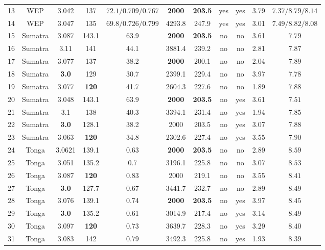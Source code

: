 \documentclass[12pt]{article}
\begin{document}
{\begin{table}
\begin{table}[H]
{\begin{tabular}{c c c c c c c c c c c }
         13 &WEP& 3.042 & 137 & $72.1/0.709/0.767$ & \textbf{2000} & \textbf{203.5} & yes  &yes & 3.79 &$7.37/8.79/8.14$ \\
         14 &WEP& 3.047 & 135 & $69.8/0.726/0.799$ & 4293.8 & 247.9 & yes  &yes &3.01 &$7.49/8.82/8.08$ \\
         15 &Sumatra& 3.087 & 143.1 & $63.9$ &  \textbf{2000}& \textbf{203.5}& no &no &3.61 & $7.79$    \\
         16 &Sumatra& 3.11 & 141 & 44.1 & 3881.4 & 239.2   &no &no &2.81 & $7.87$ \\
         17 &Sumatra& 3.077 & 137 & 38.2 & \textbf{2000} & 200.1   &no &no &2.04 &$7.89$\\ 
         18 &Sumatra& \textbf{3.0} & 129 & 30.7 & 2399.1 & 229.4   &no &no &3.97 &$7.78$ \\
         19 &Sumatra& 3.077 & \textbf{120} & 41.7 & 2604.3 & 227.6   &no &no &1.89 &$7.88$   \\
         20 &Sumatra& 3.048 & 143.1 & $63.9$ &  \textbf{2000}& \textbf{203.5}& no &yes &3.61 &$7.51$    \\
         21 &Sumatra& 3.1 & 138 & 40.3 & 3394.1 & 231.4   &no &yes &1.94 &$7.85$  \\
         22 &Sumatra& \textbf{3.0} & 128.1 & 38.2 & 2000 & 203.5   &no &yes &3.07 &$7.88$  \\
         23  &Sumatra& 3.063 & \textbf{120} & 34.8 & 2302.6& 227.4   &no &yes &3.55 & $7.90$ \\
         24&Tonga  & 3.0621 & 139.1 & 0.63 & \textbf{2000} & \textbf{203.5} &no &no &2.89 & $8.59$ \\             
         25 &Tonga  & 3.051 & 135.2 & 0.7& 3196.1 & 225.8 &no &no &3.07& $8.53$ \\             
          26 &Tonga  & 3.087 &  \textbf{120} & 0.83 & 2000 &219.1  &no &no &3.55 & $8.41$\\              
          27 &Tonga  & \textbf{3.0}  & 127.7 & 0.67 & 3441.7 &232.7  &no &no &2.89 & $8.49$ \\             
          28 &Tonga  & 3.076 & 139.1 & 0.74& \textbf{2000} & \textbf{203.5} &no &yes &3.97 &$8.45$  \\          
           29 &Tonga  & \textbf{3.0} & 135.2 & 0.61& 3014.9 & 217.4 &no &yes &3.14 &$8.49$ \\             
          30&Tonga  & 3.097 &  \textbf{120} & 0.73 &3639.7 &228.3  &no &yes &3.29& $8.40$  \\             
           31 &Tonga  & 3.083  & 142 & $0.79 $ & 3492.3  &225.8  &no &yes &1.93  & $8.39$ \\             

\end{tabular}}
\end{table}
\end{table}}
\end{document}
